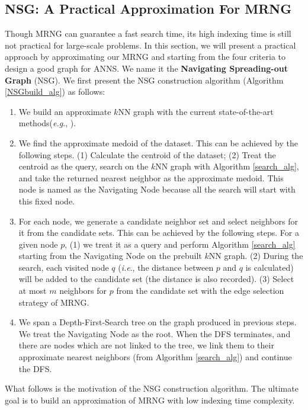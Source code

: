 \documentclass{vldb}
\def\eg {\emph{e.g}.} \def\Eg{\emph{E.g}.}
\def\ie {\emph{i.e}.} \def\Ie{\emph{I.e}.}
\begin{document}
\subsection{NSG: A Practical Approximation For MRNG}
\label{NSG}
Though MRNG can guarantee a fast search time, its high indexing time is still not practical for large-scale problems. In this section, we will present a practical approach by approximating our MRNG and starting from the four criteria to design a good graph for ANNS. We name it the \textbf{Navigating Spreading-out Graph} (NSG). We first present the NSG construction algorithm (Algorithm \ref{NSGbuild_alg}) as follows: 

\begin{enumerate}[i]
\setlength{\itemsep}{1pt}
\setlength{\parskip}{0pt}
\setlength{\parsep}{0pt}
\item We build an approximate $k$NN graph with the current state-of-the-art methods(\eg, \cite{johnson2017billion, Dong2011Efficient}).
\item We find the approximate medoid of the dataset. This can be achieved by the following steps. (1) Calculate the centroid of the dataset; (2) Treat the centroid as the query, search on the $k$NN graph with Algorithm \ref{search_alg}, and take the returned nearest neighbor as the approximate medoid. This node is named as the Navigating Node because all the search will start with this fixed node.
\item For each node, we generate a candidate neighbor set and select neighbors for it from the candidate sets. This can be achieved by the following steps. For a given node $p$, (1) we treat it as a query and perform Algorithm \ref{search_alg} starting from the Navigating Node on the prebuilt $k$NN graph. (2) During the search, each visited node $q$ (\ie , the distance between $p$ and $q$ is calculated) will be added to the candidate set (the distance is also recorded). (3) Select at most $m$ neighbors for $p$ from the candidate set with the edge selection strategy of MRNG. 
\item We span a Depth-First-Search tree on the graph produced in previous steps. We treat the Navigating Node as the root. When the DFS terminates, and there are nodes which are not linked to the tree, we link them to their approximate nearest neighbors (from Algorithm \ref{search_alg}) and continue the DFS. 
\end{enumerate}

What follows is the motivation of the NSG construction algorithm. The ultimate goal is to build an approximation of MRNG with low indexing time complexity.
\end{document}
